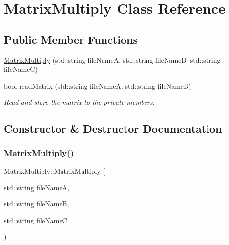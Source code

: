 \hypertarget{class_matrix_multiply}{}\section{Matrix\+Multiply Class Reference}
\label{class_matrix_multiply}
\subsection*{Public Member Functions}
\begin{DoxyCompactItemize}
\item 
\mbox{\hyperlink{class_matrix_multiply_afc15edf79510bf3545d27762018bc367}{Matrix\+Multiply}} (std\+::string file\+NameA, std\+::string file\+NameB, std\+::string file\+NameC)
\item 
bool \mbox{\hyperlink{class_matrix_multiply_ac3eacd83dd8d01a13ee922dc9a5ac6aa}{read\+Matrix}} (std\+::string file\+NameA, std\+::string file\+NameB)
\begin{DoxyCompactList}\small\item\em Read and store the matrix to the private members. \end{DoxyCompactList}\end{DoxyCompactItemize}


\subsection{Constructor \& Destructor Documentation}
\mbox{\label{class_matrix_multiply_afc15edf79510bf3545d27762018bc367}} 
\subsubsection{\texorpdfstring{Matrix\+Multiply()}{MatrixMultiply()}}
{\footnotesize\ttfamily Matrix\+Multiply\+::\+Matrix\+Multiply (\begin{DoxyParamCaption}\item[{std\+::string}]{file\+NameA,  }\item[{std\+::string}]{file\+NameB,  }\item[{std\+::string}]{file\+NameC }\end{DoxyParamCaption})\hspace{0.3cm}{\ttfamily [inline]}}



